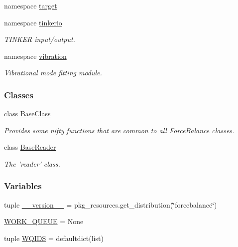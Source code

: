 \begin{DoxyCompactItemize}
namespace \hyperlink{namespaceforcebalance_1_1target}{target}
\item 
namespace \hyperlink{namespaceforcebalance_1_1tinkerio}{tinkerio}
\begin{DoxyCompactList}\small\item\em T\-I\-N\-K\-E\-R input/output. \end{DoxyCompactList}\item 
namespace \hyperlink{namespaceforcebalance_1_1vibration}{vibration}
\begin{DoxyCompactList}\small\item\em Vibrational mode fitting module. \end{DoxyCompactList}\end{DoxyCompactItemize}
\subsubsection*{Classes}
\begin{DoxyCompactItemize}
\item 
class \hyperlink{classforcebalance_1_1BaseClass}{Base\-Class}
\begin{DoxyCompactList}\small\item\em Provides some nifty functions that are common to all Force\-Balance classes. \end{DoxyCompactList}\item 
class \hyperlink{classforcebalance_1_1BaseReader}{Base\-Reader}
\begin{DoxyCompactList}\small\item\em The 'reader' class. \end{DoxyCompactList}\end{DoxyCompactItemize}
\subsubsection*{Variables}
\begin{DoxyCompactItemize}
\item 
tuple \hyperlink{namespaceforcebalance_a415490bd425b364421271cb8e2ce6672}{\-\_\-\-\_\-version\-\_\-\-\_\-} = pkg\-\_\-resources.\-get\-\_\-distribution(\char`\"{}forcebalance\char`\"{})
\item 
\hyperlink{namespaceforcebalance_a730d54f7aa4e228b2475e31765b36b68}{W\-O\-R\-K\-\_\-\-Q\-U\-E\-U\-E} = None
\item 
tuple \hyperlink{namespaceforcebalance_a582a602e14175af1441d1ec96fe9a75a}{W\-Q\-I\-D\-S} = defaultdict(list)
\end{DoxyCompactItemize}


